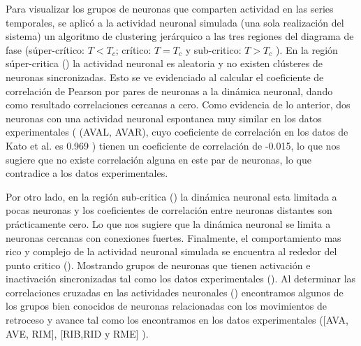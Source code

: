 Para visualizar  los grupos de neuronas que comparten actividad en  las series temporales, se aplicó a la actividad neuronal simulada (una sola realización del sistema)  un algoritmo de clustering jerárquico a las tres  regiones  del diagrama de fase (súper-crítico: $T<T_c$; crítico: $T=T_c$ y sub-critico: $T>T_c$ ).  En la región súper-critica () la actividad neuronal es aleatoria y no existen clústeres de neuronas sincronizadas. Esto se ve evidenciado al  calcular el coeficiente de correlación de Pearson  por pares de neuronas a la dinámica neuronal, dando como resultado correlaciones cercanas a cero. Como evidencia de lo  anterior, dos neuronas con una actividad neuronal  espontanea muy similar en los datos experimentales  ( (AVAL, AVAR), cuyo  coeficiente de correlación en los datos de Kato et al. es 0.969 ) tienen un coeficiente de correlación de -0.015, lo que nos sugiere que no existe correlación alguna en este par de neuronas, lo que contradice a los datos experimentales.  


Por otro lado, en la región sub-critica  ()   la dinámica neuronal esta limitada a pocas neuronas y los coeficientes de correlación entre neuronas distantes  son prácticamente cero.  Lo que nos sugiere que la dinámica neuronal se limita a  neuronas cercanas con conexiones fuertes.  Finalmente, el comportamiento mas rico y complejo de la actividad neuronal simulada  se encuentra al rededor del punto critico (). Mostrando  grupos de neuronas  que tienen  activación e inactivación sincronizadas tal como los datos experimentales (). Al determinar las correlaciones cruzadas en las actividades neuronales () encontramos algunos de los grupos  bien conocidos de neuronas relacionadas con los movimientos de retroceso y avance tal como los encontramos en los datos experimentales ([AVA, AVE,  RIM], [RIB,RID y RME] ). 



